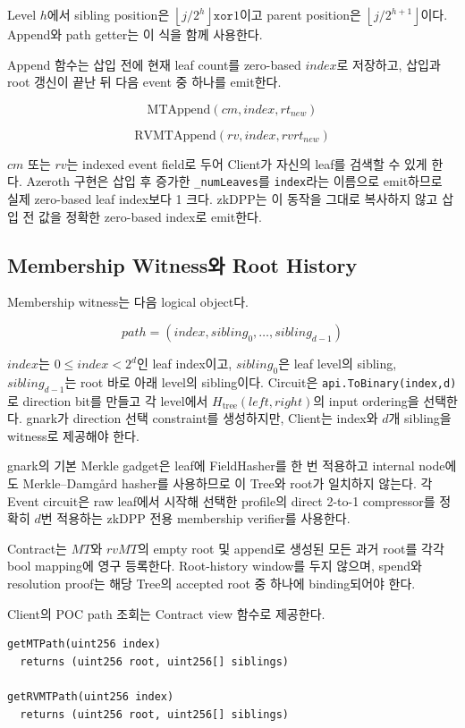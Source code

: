 \documentclass[11pt,a4paper]{extarticle}
\begin{document}
Level $h$에서 sibling position은
$\left\lfloor j/2^h\right\rfloor\mathbin{\mathtt{xor}}1$이고 parent position은
$\left\lfloor j/2^{h+1}\right\rfloor$이다. Append와 path getter는 이 식을 함께 사용한다.

Append 함수는 삽입 전에 현재 leaf count를 zero-based $index$로 저장하고, 삽입과 root
갱신이 끝난 뒤 다음 event 중 하나를 emit한다.

\[
\mathrm{MTAppend}(cm,index,rt_{new})
\]

\[
\mathrm{RVMTAppend}(rv,index,rvrt_{new})
\]

$cm$ 또는 $rv$는 indexed event field로 두어 Client가 자신의 leaf를 검색할 수 있게
한다. Azeroth 구현은 삽입 후 증가한 \texttt{\_numLeaves}를 \texttt{index}라는 이름으로
emit하므로 실제 zero-based leaf index보다 1 크다. zkDPP는 이 동작을 그대로 복사하지
않고 삽입 전 값을 정확한 zero-based index로 emit한다.

\subsection{Membership Witness와 Root History}

Membership witness는 다음 logical object다.

\[
path=(index,sibling_0,\ldots,sibling_{d-1})
\]

$index$는 $0\leq index<2^d$인 leaf index이고, $sibling_0$은 leaf level의 sibling,
$sibling_{d-1}$는 root 바로 아래 level의 sibling이다. Circuit은
\texttt{api.ToBinary(index,d)}로 direction bit를 만들고 각 level에서
$H_{\mathrm{tree}}(left,right)$의 input ordering을 선택한다. gnark가 direction 선택
constraint를 생성하지만, Client는 index와 $d$개 sibling을 witness로 제공해야 한다.

gnark의 기본 Merkle gadget은 leaf에 FieldHasher를 한 번 적용하고 internal node에도
Merkle--Damg\aa rd hasher를 사용하므로 이 Tree와 root가 일치하지 않는다. 각 Event
circuit은 raw leaf에서 시작해 선택한 profile의 direct 2-to-1 compressor를 정확히 $d$번
적용하는 zkDPP 전용 membership verifier를 사용한다.

Contract는 $MT$와 $rvMT$의 empty root 및 append로 생성된 모든 과거 root를 각각
bool mapping에 영구 등록한다. Root-history window를 두지 않으며, spend와 resolution
proof는 해당 Tree의 accepted root 중 하나에 binding되어야 한다.

Client의 POC path 조회는 Contract view 함수로 제공한다.

\begin{verbatim}
getMTPath(uint256 index)
  returns (uint256 root, uint256[] siblings)

getRVMTPath(uint256 index)
  returns (uint256 root, uint256[] siblings)
\end{verbatim}
\end{document}
